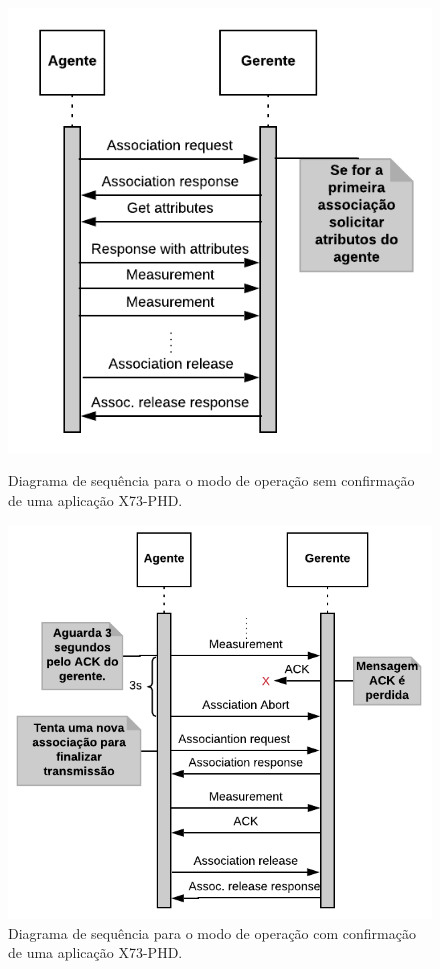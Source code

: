 \begin{figure}[htbp]
\centering
\begin{minipage}{.5\textwidth}
\centering
\includegraphics[width=.8\textwidth]{figures/unconfirmed.png}
\caption{Diagrama de sequência para o modo de operação sem confirmação de uma aplicação X73-PHD.}
\label{fig:unconfirmedMode}
\end{minipage}%
\begin{minipage}{.5\textwidth}
\centering
\includegraphics[width=.9\textwidth]{figures/PerdadoACKmodocomconfirmacao.png}
\caption{Diagrama de sequência para o modo de operação com confirmação de uma aplicação X73-PHD.}
\label{fig:confirmedMode} 
\end{minipage}%
\end{figure}

